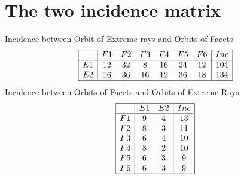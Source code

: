 \documentclass[12pt]{article}
\begin{document}
\section{The two incidence matrix}
Incidence between Orbit of Extreme rays and Orbits of Facets
\begin{equation*}
\begin{array}{|c|cccccc|c|}
\hline
&F1&F2&F3&F4&F5&F6&Inc\\
\hline
E1&12&32&8&16&24&12&104\\
E2&16&36&16&12&36&18&134\\
\hline
\end{array}
\end{equation*}
Incidence between Orbits of Facets and Orbits of Extreme Rays
\begin{equation*}
\begin{array}{|c|cc|c|}
\hline
&E1&E2&Inc\\
\hline
F1&9&4&13\\
F2&8&3&11\\
F3&6&4&10\\
F4&8&2&10\\
F5&6&3&9\\
F6&6&3&9\\
\hline
\end{array}
\end{equation*}
\end{document}
